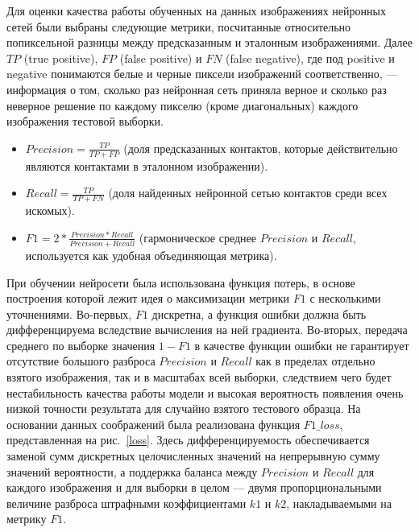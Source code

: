 Для оценки качества работы обученных на данных изображениях нейронных сетей были выбраны следующие метрики, посчитанные относительно попиксельной разницы между предсказанным и эталонным изображениями. Далее $TP$ (true positive), $FP$ (false positive) и $FN$ (false negative), где под positive и negative  понимаются белые и черные пиксели изображений соответственно, --- информация о том, сколько раз нейронная сеть приняла верное и сколько раз неверное решение по каждому пикселю (кроме диагональных) каждого изображения тестовой выборки.
\begin{itemize} 
    \item $Precision = \frac{TP}{TP + FP}$ (доля предсказанных контактов, которые действительно являются контактами в эталонном изображении).
    \item $Recall = \frac{TP}{TP + FN}$ (доля найденных нейронной сетью контактов среди всех искомых).
    \item $F1 = 2 * \frac{Precision * Recall}{Precision + Recall}$ (гармоническое среднее $Precision$ и $Recall$, используется как удобная объединяющая метрика).
\end{itemize}

При обучении нейросети была использована функция потерь, в основе построения которой лежит идея о максимизации метрики $F1$ с несколькими уточнениями. Во-первых, $F1$ дискретна, а функция ошибки должна быть дифференцируема вследствие вычисления на ней градиента. Во-вторых, передача среднего по выборке значения $1 - F1$ в качестве функции ошибки не гарантирует отсутствие большого разброса $Precision$ и $Recall$ как в пределах отдельно взятого изображения, так и в масштабах всей выборки, следствием чего будет нестабильность качества работы модели и высокая вероятность появления очень низкой точности результата для случайно взятого тестового образца. На основании данных соображений была реализована функция $F1\_loss$, представленная на рис.~\ref{loss}. Здесь дифференцируемость обеспечивается заменой сумм дискретных целочисленных значений на непрерывную сумму значений вероятности, а поддержка баланса между $Precision$ и $Recall$ для каждого изображения и для выборки в целом --- двумя пропорциональными величине разброса штрафными коэффициентами $k1$ и $k2$, накладываемыми на метрику $F1$.

